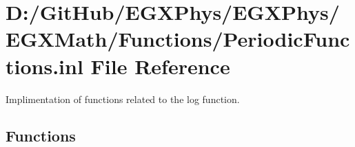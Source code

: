 \hypertarget{_periodic_functions_8inl}{}\section{D\+:/\+Git\+Hub/\+E\+G\+X\+Phys/\+E\+G\+X\+Phys/\+E\+G\+X\+Math/\+Functions/\+Periodic\+Functions.inl File Reference}
\label{_periodic_functions_8inl}


Implimentation of functions related to the log function.  


\subsection*{Functions}
